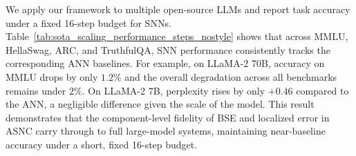 \documentclass{article}
\theoremstyle{plain}
\theoremstyle{definition}
\theoremstyle{remark}
\begin{document}
We apply our framework to multiple open-source LLMs and report task accuracy under a fixed 16-step budget for SNNs. Table~\ref{tab:sota_scaling_performance_steps_nostyle} shows that across MMLU, HellaSwag, ARC, and TruthfulQA, SNN performance consistently tracks the corresponding ANN baselines. For example, on LLaMA-2 70B, accuracy on MMLU drops by only $1.2\%$ and the overall degradation across all benchmarks remains under $2\%$. On LLaMA-2 7B, perplexity rises by only $+0.46$ compared to the ANN, a negligible difference given the scale of the model. This result demonstrates that the component-level fidelity of BSE and localized error in ASNC carry through to full large-model systems, maintaining near-baseline accuracy under a short, fixed 16-step budget.

\end{document}
